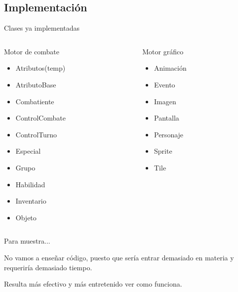 \documentclass[9pt,xcolor=svgnames]{beamer}
\begin{document}
    
  \subsection{Implementación}
  
  \begin{frame}{Clases ya implementadas}
   
    \begin{columns}
     
     \begin{column}{3cm}
      \begin{block}{Motor de combate}
       \begin{itemize}
	\item Atributos(temp)
	\item AtributoBase
	\item Combatiente
	\item ControlCombate
	\item ControlTurno
	\item Especial
	\item Grupo
	\item Habilidad
	\item Inventario
	\item Objeto      
       \end{itemize}
      \end{block}
     \end{column}
     
     \begin{column}{3cm}
      \begin{block}{Motor gráfico}
       \begin{itemize}
	\item Animación
	\item Evento
	\item Imagen
	\item Pantalla
	\item Personaje
	\item Sprite
	\item Tile
       \end{itemize}
      \end{block}
     \end{column}
     
    \end{columns}
  \end{frame}
  
  \begin{frame}{Para muestra...}
   
   No vamos a enseñar código, puesto que sería entrar demasiado en
   materia y requeriría demasiado tiempo.\\ 
   \vspace*{0.5cm}
   
   Resulta más efectivo y más entretenido ver como funciona.
   
  \end{frame}
  
\end{document}
